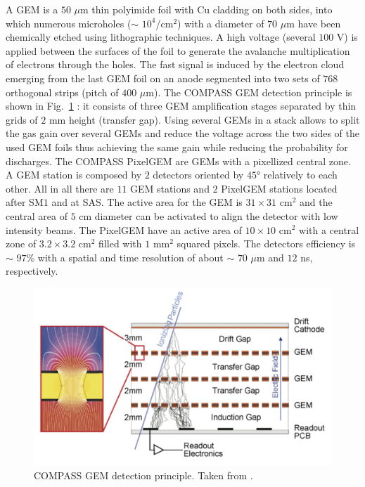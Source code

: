 A GEM is a $50$ $\mu$m thin polyimide foil with Cu cladding on both sides, into which numerous microholes ($\sim$ $10^4$/cm$^2$) with a diameter of $70$ $\mu$m have been chemically etched using lithographic techniques. A high voltage (several $100$ V) is applied between the surfaces of the foil to generate the avalanche multiplication of electrons through the holes. The fast signal is induced by the electron cloud emerging from the last GEM foil on an anode segmented into two sets of $768$ orthogonal strips (pitch of $400$ $\mu$m). The COMPASS GEM detection principle is shown in Fig.~\ref{pic:GEM} : it consists of three GEM amplification stages separated by thin grids of $2$ mm height (transfer gap). Using several GEMs in a stack allows to split the gas gain over several GEMs and reduce the voltage across the two sides of the used GEM foils thus achieving the same gain while reducing the probability for discharges. The COMPASS PixelGEM are GEMs with a pixellized central zone. A GEM station is composed by $2$ detectors oriented by $45$° relatively to each other. All in all there are $11$ GEM stations and $2$ PixelGEM stations located after SM$1$ and at SAS. The active area for the GEM is $31 \times 31$ cm$^2$ and the central area of $5$ cm diameter can be activated to align the detector with low intensity beams. The PixelGEM have an active area of $10 \times 10$ cm$^2$ with a central zone of $3.2 \times 3.2$ cm$^2$ filled with $1$ mm$^2$ squared pixels. The detectors efficiency is $\sim$ $97$\% with a spatial and time resolution of about $\sim$ $70$ $\mu$m and $12$ ns, respectively.

\begin{figure}[!h]
  \centering
	\includegraphics[scale=0.5]{./gfx/GEM.png}
	\caption{COMPASS GEM detection principle. Taken from \cite{NIM}.}
	\label{pic:GEM}
\end{figure}


